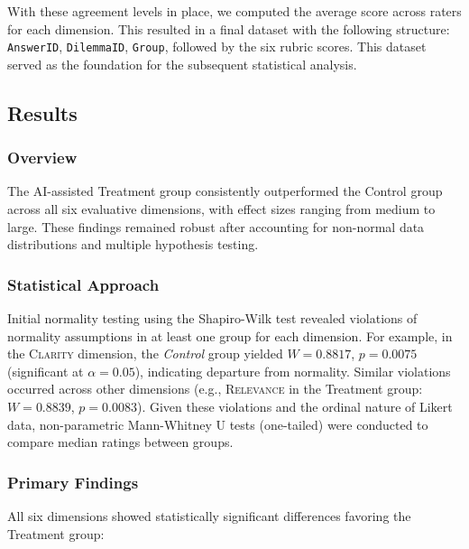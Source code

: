 With these agreement levels in place, we computed the average score across raters for each dimension. This resulted in a final dataset with the following structure: \texttt{AnswerID}, \texttt{DilemmaID}, \texttt{Group}, followed by the six rubric scores. This dataset served as the foundation for the subsequent statistical analysis.

\subsection{Results}

\subsubsection{Overview}

The AI-assisted Treatment group consistently outperformed the Control group across all six evaluative dimensions, with effect sizes ranging from medium to large. These findings remained robust after accounting for non-normal data distributions and multiple hypothesis testing.

\subsubsection{Statistical Approach}

Initial normality testing using the Shapiro-Wilk test revealed violations of normality assumptions in at least one group for each dimension. For example, in the \textsc{Clarity} dimension, the \textit{Control} group yielded $W = 0.8817$, $p = 0.0075$ (significant at $\alpha = 0.05$), indicating departure from normality. Similar violations occurred across other dimensions (e.g., \textsc{Relevance} in the Treatment group: $W = 0.8839$, $p = 0.0083$). Given these violations and the ordinal nature of Likert data, non-parametric Mann-Whitney U tests (one-tailed) were conducted to compare median ratings between groups.

\subsubsection{Primary Findings}

All six dimensions showed statistically significant differences favoring the Treatment group:

